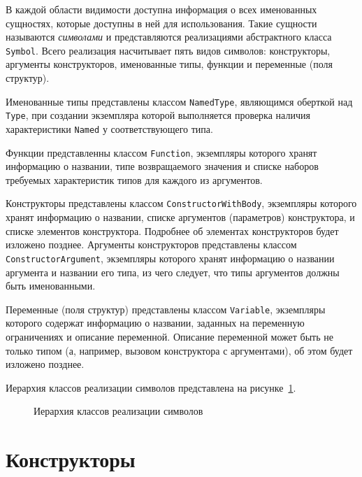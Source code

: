 \documentclass[times,specification,annotation]{style/itmo-student-thesis/itmo-student-thesis}
\begin{document}
В каждой области видимости доступна информация о всех именованных сущностях, которые доступны в ней для использования. Такие сущности называются \textit{символами} и представляются реализациями абстрактного класса \texttt{Symbol}. Всего реализация насчитывает пять видов символов: конструкторы, аргументы конструкторов, именованные типы, функции и переменные (поля структур). 

Именованные типы представлены классом \texttt{NamedType}, являющимся оберткой над \texttt{Type}, при создании экземпляра которой выполняется проверка наличия характеристики \texttt{Named} у соответствующего типа.

Функции представленны классом \texttt{Function}, экземпляры которого хранят информацию о названии, типе возвращаемого значения и списке наборов требуемых характеристик типов для каждого из аргументов.

Конструкторы представлены классом \texttt{ConstructorWithBody}, экземпляры которого хранят информацию о названии, списке аргументов (параметров) конструктора, и списке элементов конструктора. Подробнее об элементах конструкторов будет изложено позднее. Аргументы конструкторов представлены классом \texttt{ConstructorArgument}, экземпляры которого хранят информацию о названии аргумента и названии его типа, из чего следует, что типы аргументов должны быть именованными.

Переменные (поля структур) представлены классом \texttt{Variable}, экземпляры которого содержат информацию о названии, заданных на переменную ограничениях и описание переменной. Описание переменной может быть не только типом (а, например, вызовом конструктора с аргументами), об этом будет изложено позднее.

Иерархия классов реализации символов представлена на рисунке~\ref{symbol-classes-hierarchy}.

\begin{figure}[!h]
\caption{Иерархия классов реализации символов}\label{symbol-classes-hierarchy}
\centering
{}
\end{figure}

\section{Конструкторы}
\end{document}
